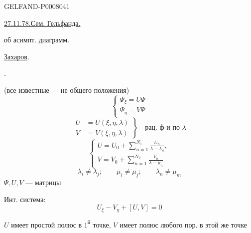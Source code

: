 \begin{GelfandAdjacentEvidence}{GELFAND-P000804}{1}

\underline{\underline{27.11.78.}}\qquad\underline{Сем. Гельфанда.}


об асимпт. диаграмм.

\underline{\underline{Захаров}}.

.

(все известные --- не общего положения)
\begin{equation*}
\begin{cases}
\Psi_\xi=U\Psi\\
\Psi_\eta=V\Psi
\end{cases}
\tag{1}
\end{equation*}
\[
\left.\begin{aligned}
U&=U(\xi,\eta,\lambda)\\
V&=V(\xi,\eta,\lambda)
\end{aligned}\right\}\quad\text{рац. ф-и по }\lambda
\]
\begin{equation*}
\begin{cases}
\displaystyle U=U_0+\sum_{n=1}^{N_1}\frac{U_n}{\lambda-\lambda_n},\\[1ex]
\displaystyle V=V_0+\sum_{n=1}^{N_2}\frac{V_n}{\lambda-\mu_n}
\end{cases}
\tag{2}
\end{equation*}
\[
\lambda_i\ne\lambda_j;\qquad\mu_i\ne\mu_j;\qquad\lambda_n\ne\mu_m
\]
\(\Psi,U,V\) --- матрицы

Инт. система:
\begin{equation*}
U_\xi-V_\eta+[U,V]=0
\tag{3}
\end{equation*}
\end{GelfandAdjacentEvidence}


 \(U\) имеет простой полюс в \(1^{\text{й}}\) точке,
\(V\) имеет полюс любого пор. в этой же точке


